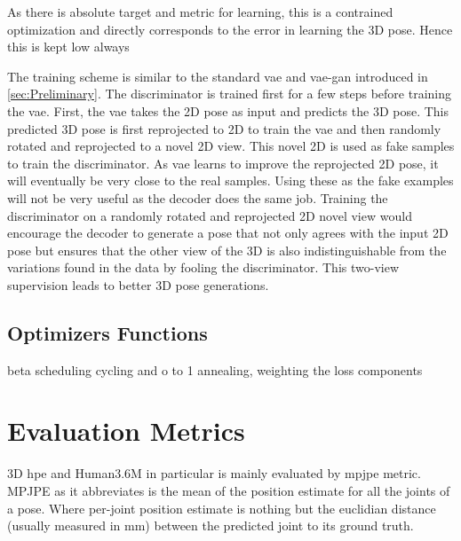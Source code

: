 As there is absolute target and metric for learning, this is a contrained optimization and directly corresponds to the error in learning the 3D pose. Hence this is kept low always






The training scheme is similar to the standard \ac{vae} and \ac{vae}-\ac{gan} introduced in \ref{sec:Preliminary}. The discriminator is trained first for a few steps before training the \ac{vae}. First, the \ac{vae} takes the 2D pose as input and predicts the 3D pose. This predicted 3D pose is first reprojected to 2D to train the \ac{vae} and then randomly rotated and reprojected to a novel 2D view. This novel 2D is used as fake samples to train the discriminator. As \ac{vae} learns to improve the reprojected 2D pose, it will eventually be very close to the real samples. Using these as the fake examples will not be very useful as the decoder does the same job. Training the discriminator on a randomly rotated and reprojected 2D novel view would encourage the decoder to generate a pose that not only agrees with the input 2D pose but ensures that the other view of the 3D is also indistinguishable from the variations found in the data by fooling the discriminator. This two-view supervision leads to better 3D pose generations.




\subsection{Optimizers Functions}
beta scheduling cycling and o to 1 annealing, weighting the loss components

\section{Evaluation Metrics} %
3D \ac{hpe} and Human3.6M in particular is mainly evaluated by \ac{mpjpe} metric. MPJPE as it abbreviates is the mean of the position estimate for all the joints of a pose. Where per-joint position estimate is nothing but the euclidian distance (usually measured in mm) between the predicted joint to its ground truth.



